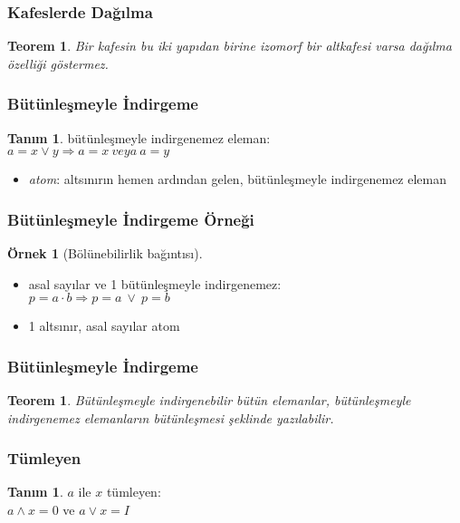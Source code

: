 \documentclass[dvipsnames]{beamer}
\theoremstyle{definition}
\newtheorem{tanim}[theorem]{Tanım}
\theoremstyle{example}
\newtheorem{ornek}[theorem]{Örnek}
\theoremstyle{plain}
\newtheorem{teorem}[theorem]{Teorem}
\begin{document}
\begin{frame}
  \frametitle{Kafeslerde Dağılma}

  \begin{teorem}
    Bir kafesin bu iki yapıdan birine izomorf bir altkafesi varsa dağılma
    özelliği göstermez.
  \end{teorem}
\end{frame}

\begin{frame}
  \frametitle{Bütünleşmeyle İndirgeme}

  \begin{tanim}
    \alert{bütünleşmeyle indirgenemez eleman}:\\
    $a = x \vee y \Rightarrow a = x ~veya~ a = y$
  \end{tanim}

  \pause
  \medskip
  \begin{itemize}
    \item \emph{atom}: altsınırın hemen ardından gelen, bütünleşmeyle
      indirgenemez eleman
  \end{itemize}
\end{frame}

\begin{frame}
  \frametitle{Bütünleşmeyle İndirgeme Örneği}

  \begin{ornek}[Bölünebilirlik bağıntısı]
    \begin{itemize}
      \item asal sayılar ve 1 bütünleşmeyle indirgenemez:\\
        $p = a \cdot b \Rightarrow p = a~\vee~p = b$

      \pause
      \medskip
      \item 1 altsınır, asal sayılar atom
    \end{itemize}
  \end{ornek}
\end{frame}

\begin{frame}
  \frametitle{Bütünleşmeyle İndirgeme}

  \begin{teorem}
    Bütünleşmeyle indirgenebilir bütün elemanlar, bütünleşmeyle indirgenemez
    elemanların bütünleşmesi şeklinde yazılabilir.
  \end{teorem}
\end{frame}

\begin{frame}
  \frametitle{Tümleyen}

  \begin{tanim}
    $a$ ile $x$ \alert{tümleyen}:\\
    $a \wedge x = 0$ ve $a \vee x = I$
  \end{tanim}
\end{frame}
\end{document}
